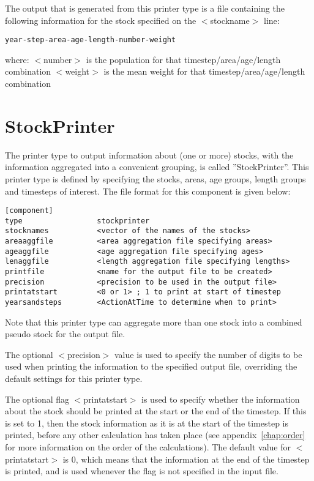 \documentclass[10pt,twoside]{book}
\begin{document}
\bigskip
The output that is generated from this printer type is a file containing the following information for the stock specified on the $<$stockname$>$ line:

{\small\begin{verbatim}
year-step-area-age-length-number-weight
\end{verbatim}}

where:\newline
$<$number$>$ is the population for that timestep/area/age/length combination\newline
$<$weight$>$ is the mean weight for that timestep/area/age/length combination

\section{StockPrinter}\label{sec:stockprinter}
The printer type to output information about (one or more) stocks, with the information aggregated into a convenient grouping, is called ''StockPrinter''.  This printer type is defined by specifying the stocks, areas, age groups, length groups and timesteps of interest.  The file format for this component is given below:

{\small\begin{verbatim}
[component]
type                 stockprinter
stocknames           <vector of the names of the stocks>
areaaggfile          <area aggregation file specifying areas>
ageaggfile           <age aggregation file specifying ages>
lenaggfile           <length aggregation file specifying lengths>
printfile            <name for the output file to be created>
precision            <precision to be used in the output file>
printatstart         <0 or 1> ; 1 to print at start of timestep
yearsandsteps        <ActionAtTime to determine when to print>
\end{verbatim}}

Note that this printer type can aggregate more than one stock into a combined pseudo stock for the output file.

\bigskip
The optional $<$precision$>$ value is used to specify the number of digits to be used when printing the information to the specified output file, overriding the default settings for this printer type.

\bigskip
The optional flag $<$printatstart$>$ is used to specify whether the information about the stock should be printed at the start or the end of the timestep.  If this is set to 1, then the stock information as it is at the start of the timestep is printed, before any other calculation has taken place (see appendix~\ref{chap:order} for more information on the order of the calculations).  The default value for $<$printatstart$>$ is 0, which means that the information at the end of the timestep is printed, and is used whenever the flag is not specified in the input file.
\end{document}
